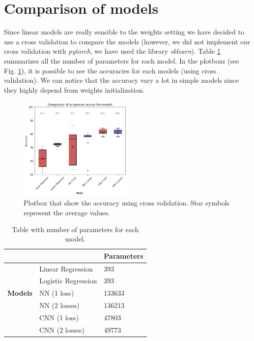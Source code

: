 \documentclass[journal, a4paper]{IEEEtran}
\begin{document}
\section{Comparison of models}
\label{sec:comparison}
Since linear models are really sensible to the weights setting 
we have decided to use a cross validation to compare the models (however, we did not implement our cross validation with \textit{pytorch}, we have used the library \textit{sklearn}).
Table \ref{table:params} summarizes all the number of parameters for each model. In the plotboxs (see Fig. \ref{fig:train_acc_box}), it is possible to see the accuracies for each models (using cross validation). We can notice that the accuracy vary a lot in simple models since they highly depend from weights initialization.

\begin{figure}[!h]
    \centering
    \includegraphics[width=0.5\textwidth]{boxplot.png}
    \caption{Plotbox that show the accuracy using cross validation. Star symbols represent the average values.}
    \label{fig:train_acc_box}
\end{figure}


\begin{table}
\centering
\caption{Table with number of parameters for each model.}
\label{table:params}
\begin{tabular}{|l|l|l|} 
\cline{3-3}
\multicolumn{1}{l}{} &                     & \textbf{Parameters}  \\ 
\cline{3-3}
\hline
                     & Linear Regression  & 393     \\ 
\cline{2-3}
               & Logistic Regression & 393     \\ 
\cline{2-3}
 \textbf{Models}   & NN (1 loss)~        & 133633  \\ 
\cline{2-3}
                     & NN (2 losses)~      &  136213  \\ 
\cline{2-3}
                     & CNN (1 loss)~       & 47803   \\ 
\cline{2-3}
                     & CNN (2 losses)     & 49773   \\
\hline
\end{tabular}
\end{table}
\end{document}
